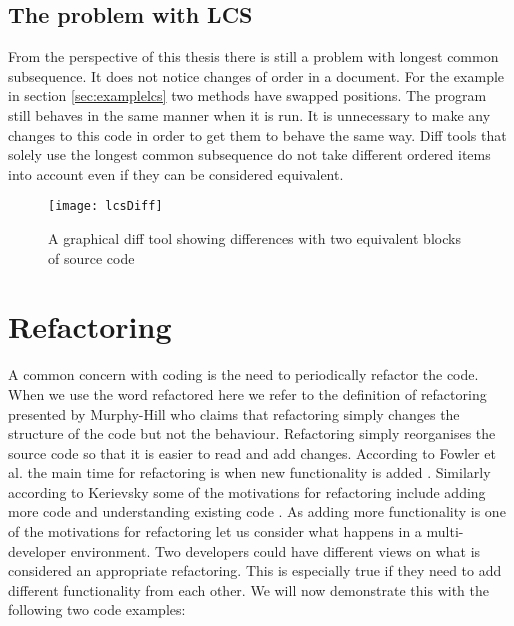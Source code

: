 
\subsection{The problem with LCS}
From the perspective of this thesis there is still a problem with longest common subsequence. 
It does not notice changes of order in a document.  
For the example in section \ref{sec:examplelcs} two methods have swapped positions.
The program still behaves in the same manner when it is run.
It is unnecessary to make any changes to this code in order to get them to behave the same way.
Diff tools that solely use the longest common subsequence do not take different ordered items into account even if they can be considered equivalent.

\begin{figure}[h]
\begin{center}
\texttt{[image: lcsDiff]}
\end{center}
 \caption{A graphical diff tool showing differences with two equivalent blocks of source code}
\end{figure}


 

\section{Refactoring}
A common concern with coding is the need to periodically refactor the code. 
When we use the word refactored here we refer to the definition of refactoring presented by Murphy-Hill \cite{Murphy-Hill2008} who claims that refactoring simply changes the structure of the code but not the behaviour.
Refactoring simply reorganises the source code so that it is easier to read and add changes. 
According to Fowler et al. the main time for refactoring is when new functionality is added \cite{Fowler1999}. 
Similarly according to Kerievsky some of the motivations for refactoring include adding more code and understanding existing code \cite{Kerievsky2004}.
As adding more functionality is one of the motivations for refactoring let us consider what happens in a multi-developer environment. 
Two developers could have different views on what is considered an appropriate refactoring. 
This is especially true if they need to add different functionality from each other. 
We will now demonstrate this with the following two code examples:

